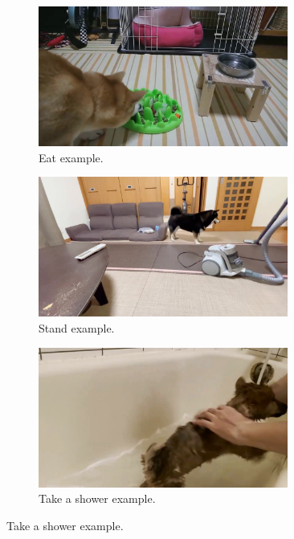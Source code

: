 \documentclass[letterpaper]{article}
\begin{document}
\begin{figure}[h]
\begin{subfigure}[]{0.3\textwidth}
	\centering
	\includegraphics[width=0.9\textwidth]{images/eat.jpg}
	\caption{Eat example.}
\label{fig:act7}
\end{subfigure}
\begin{subfigure}[]{0.3\textwidth}
	\centering
	\includegraphics[width=0.9\textwidth]{images/stand.jpg}
	\caption{Stand example.}
	\label{fig:act8}
\end{subfigure}
\begin{subfigure}[]{0.3\textwidth}
	\centering
	\includegraphics[width=0.9\textwidth]{images/takeashower.jpg}
	\caption{Take a shower example.}
\label{fig:act9}
\end{subfigure}


\end{figure}
\end{document}
